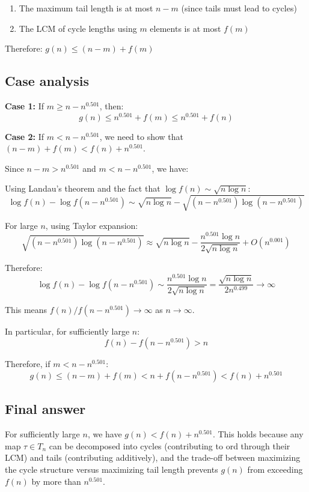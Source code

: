 \documentclass[12pt,a4paper]{article}
\theoremstyle{definition}
\begin{document}
        \begin{enumerate}
            \item The maximum tail length is at most $n - m$ (since tails must lead to cycles)
            \item The LCM of cycle lengths using $m$ elements is at most $f(m)$
        \end{enumerate}

        Therefore: $g(n) \leq (n - m) + f(m)$

        \subsection*{Case analysis}

        \textbf{Case 1:} If $m \geq n - n^{0.501}$, then:
        $$g(n) \leq n^{0.501} + f(m) \leq n^{0.501} + f(n)$$

        \textbf{Case 2:} If $m < n - n^{0.501}$, we need to show that $(n - m) + f(m) < f(n) + n^{0.501}$.

        Since $n - m > n^{0.501}$ and $m < n - n^{0.501}$, we have:

        Using Landau's theorem and the fact that $\log f(n) \sim \sqrt{n \log n}$:
        $$\log f(n) - \log f(n - n^{0.501}) \sim \sqrt{n \log n} - \sqrt{(n - n^{0.501}) \log(n - n^{0.501})}$$

        For large $n$, using Taylor expansion:
        $$\sqrt{(n - n^{0.501}) \log(n - n^{0.501})} \approx \sqrt{n \log n} - \frac{n^{0.501} \log n}{2\sqrt{n \log n}} + O(n^{0.001})$$

        Therefore:
        $$\log f(n) - \log f(n - n^{0.501}) \sim \frac{n^{0.501} \log n}{2\sqrt{n \log n}} = \frac{\sqrt{n \log n}}{2n^{0.499}} \to \infty$$

        This means $f(n)/f(n - n^{0.501}) \to \infty$ as $n \to \infty$.

        In particular, for sufficiently large $n$:
        $$f(n) - f(n - n^{0.501}) > n$$

        Therefore, if $m < n - n^{0.501}$:
        $$g(n) \leq (n - m) + f(m) < n + f(n - n^{0.501}) < f(n) + n^{0.501}$$

        \subsection*{Final answer}

        For sufficiently large $n$, we have $g(n) < f(n) + n^{0.501}$. This holds because any map $\tau \in T_n$ can be decomposed into cycles (contributing to ord through their LCM) and tails (contributing additively), and the trade-off between maximizing the cycle structure versus maximizing tail length prevents $g(n)$ from exceeding $f(n)$ by more than $n^{0.501}$.
\end{document}
